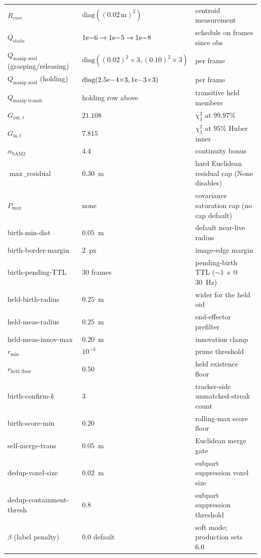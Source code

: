 \documentclass[11pt]{article}
\begin{document}
\begin{tabular}{@{}lll@{}}
$R_{cam}$ & $\mathrm{diag}((0.02\,\mathrm{m})^2)$ & centroid measurement \\
$Q_{\text{static}}$ & $1{\rm e}{-}6\to1{\rm e}{-}5\to1{\rm e}{-}8$ & schedule on frames since obs \\
$Q_{\text{manip seed}}$ (grasping/releasing) & $\mathrm{diag}((0.02)^2{\times}3,(0.10)^2{\times}3)$ & per frame \\
$Q_{\text{manip seed}}$ (holding) & $\mathrm{diag}(2.5{\rm e}{-}4{\times}3,1{\rm e}{-}3{\times}3)$ & per frame \\
$Q_{\text{manip transit}}$ & holding row above & transitive held members \\
$G_{\text{out},t}$ & $21.108$ & $\chi^2_3$ at $99.97\%$ \\
$G_{\text{in},t}$ & $7.815$ & $\chi^2_3$ at $95\%$ Huber inner \\
$\alpha_{\text{SAM2}}$ & $4.4$ & continuity bonus \\
$\max\_$residual & $0.30$~m & hard Euclidean residual cap (None disables) \\
$P_{\max}$ & none & covariance saturation cap (no cap default) \\
birth-min-dist & $0.05$~m & default near-live radius \\
birth-border-margin & $2$~px & image-edge margin \\
birth-pending-TTL & $30$ frames & pending-birth TTL ($\sim\!1$~s @ 30~Hz) \\
held-birth-radius & $0.25$~m & wider for the held oid \\
held-meas-radius & $0.25$~m & end-effector prefilter \\
held-meas-innov-max & $0.20$~m & innovation clamp \\
$r_{\min}$ & $10^{-3}$ & prune threshold \\
$r_{\text{held floor}}$ & $0.50$ & held existence floor \\
birth-confirm-$k$ & $3$ & tracker-side unmatched-streak count \\
birth-score-min & $0.20$ & rolling-max score floor \\
self-merge-trans & $0.05$~m & Euclidean merge gate \\
dedup-voxel-size & $0.02$~m & subpart suppression voxel size \\
dedup-containment-thresh & $0.8$ & subpart suppression threshold \\
$\beta$ (label penalty) & $0.0$ default & soft mode; production sets $6.0$ \\

\end{tabular}
\end{document}
